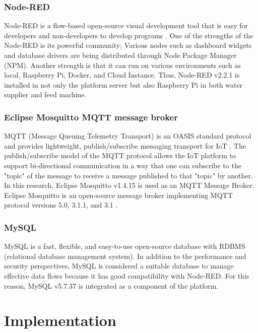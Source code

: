 ﻿\documentclass[conference]{IEEEtran}
\begin{document}
\subsubsection{Node-RED}
Node-RED is a flow-based open-source visual development tool that is easy for developers and non-developers to develop programs \cite{b12}.
One of the strengths of the Node-RED is its powerful community; Various nodes such as dashboard widgets and database drivers are being distributed through Node Package Manager (NPM).
Another strength is that it can run on various environments such as local, Raspberry Pi, Docker, and Cloud Instance.
Thus, Node-RED v2.2.1 is installed in not only the platform server but also Raspberry Pi in both water supplier and feed machine.

\subsubsection{Eclipse Mosquitto MQTT message broker}
MQTT (Message Queuing Telemetry Transport) is an OASIS standard protocol and provides lightweight, publish/subscribe messaging transport for IoT \cite{b8}.
The publish/subscribe model of the MQTT protocol allows the IoT platform to support bi-directional communication in a way that one can subscribe to the "topic" of the message to receive a message published to that "topic" by another.
In this research, Eclipse Mosquitto v1.4.15 is used as an MQTT Message Broker.
Eclipse Mosquitto is an open-source message broker implementing MQTT protocol versions 5.0, 3.1.1, and 3.1 \cite{b13}.

\subsubsection{MySQL}
MySQL is a fast, flexible, and easy-to-use open-source database with RDBMS (relational database management system).
In addition to the performance and security perspectives, MySQL is considered a suitable database to manage effective data flows because it has good compatibility with Node-RED.
For this reason, MySQL v5.7.37 is integrated as a component of the platform.

\section{Implementation}
\end{document}
